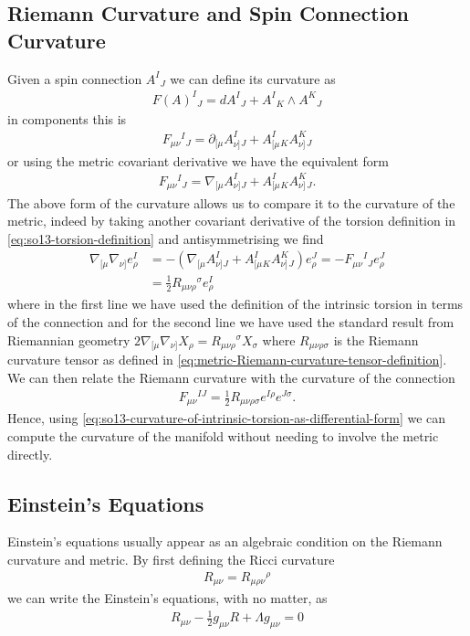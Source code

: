 \documentclass[10pt]{report}
\theoremstyle{definition}
\begin{document}
\subsection{Riemann Curvature and Spin Connection Curvature}
Given a spin connection $A^I{}_J$ we can define its curvature as 
\begin{align}
    F(A)^I{}_J = dA^I{}_J + A^I{}_K \wedge A^K{}_J \label{eq:so13-curvature-of-intrinsic-torsion-as-differential-form}
\end{align}
in components this is 
\begin{align}
    F_{\mu\nu}{}^I{}_J = \partial_{[\mu} A^I_{\nu]}{}_J + A^I_{[\mu}{}_K A^K_{\nu]}{}_J
\end{align}
or using the metric covariant derivative we have the equivalent form 
\begin{align}
    F_{\mu\nu}{}^I{}_J = \nabla_{[\mu} A^I_{\nu]}{}_J + A^I_{[\mu}{}_K A^K_{\nu]}{}_J.
\end{align}
The above form of the curvature allows us to compare it to the curvature of the metric, indeed by taking another covariant derivative of the torsion definition in \cref{eq:so13-torsion-definition} and antisymmetrising we find
\begin{align}
    \nabla_{[\mu} \nabla_{\nu]} e^I_\rho & = - (\nabla_{[\mu} A^I_{\nu]}{}_J + A^I_{[\mu}{}_K A^K_{\nu]}{}_J) e^J_\rho = -F_{\mu\nu}{}^I{}_J e^J_\rho \\
                                         & = \frac{1}{2} R_{\mu\nu\rho}{}^\sigma e^I_\rho
\end{align}
where in the first line we have used the definition of the intrinsic torsion in terms of the connection and for the second line we have used the standard result from Riemannian geometry $2 \nabla_{[\mu} \nabla_{\nu]} X_\rho = R_{\mu\nu\rho}{}^\sigma X_\sigma$ where $R_{\mu\nu\rho\sigma}$ is the Riemann curvature tensor as defined in \cref{eq:metric-Riemann-curvature-tensor-definition}. We can then relate the Riemann curvature with the curvature of the connection 
\begin{align}
    F_{\mu\nu}{}^{IJ} = \frac{1}{2} R_{\mu\nu\rho\sigma} e^{I\rho} e^{J\sigma}.
\end{align}
Hence, using \cref{eq:so13-curvature-of-intrinsic-torsion-as-differential-form} we can compute the curvature of the manifold without needing to involve the metric directly.

\subsection{Einstein's Equations}
Einstein's equations usually appear as an algebraic condition on the Riemann curvature and metric. By first defining the Ricci curvature 
\begin{align}
    R_{\mu\nu} = R_{\mu\rho\nu}{}^\rho
\end{align}
we can write the Einstein's equations, with no matter, as
\begin{align}
    R_{\mu\nu} - \frac{1}{2}g_{\mu\nu} R + \Lambda g_{\mu\nu} = 0
\end{align}
\end{document}
